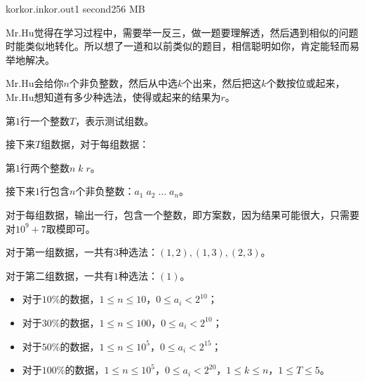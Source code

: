 \documentclass[11pt,a4paper,oneside]{article}
\begin{document}
\begin{problem}{kor}{kor.in}{kor.out}{1 second}{256 MB}	
	
	Mr.Hu觉得在学习过程中，需要举一反三，做一题要理解透，然后遇到相似的问题时能类似地转化。所以想了一道和以前类似的题目，相信聪明如你，肯定能轻而易举地解决。
	
	Mr.Hu会给你$n$个非负整数，然后从中选$k$个出来，然后把这$k$个数按位或起来，Mr.Hu想知道有多少种选法，使得或起来的结果为$r$。
	
	\InputFile
	
	第$1$行一个整数$T$，表示测试组数。
	
	接下来$T$组数据，对于每组数据：
	
	第$1$行两个整数$n \; k \; r$。
	
	接下来$1$行包含$n$个非负整数：$a_1 \; a_2 \; \dots \; a_n$。
	
	\OutputFile
	
	对于每组数据，输出一行，包含一个整数，即方案数，因为结果可能很大，只需要对$10^9 + 7$取模即可。
	
	\Example
	
	\begin{example}
	\end{example}
	
	对于第一组数据，一共有$3$种选法：$(1,2),(1,3),(2,3)$。
	
	对于第二组数据，一共有$1$种选法：$(1)$。
	
	
	\Note
	
	\begin{itemize}
		\item 对于$10\%$的数据，$1 \leq n \leq 10$，$0 \leq a_i < 2^{10}$；
		\item 对于$30\%$的数据，$1 \leq n \leq 100$，$0 \leq a_i < 2^{10}$；
		\item 对于$50\%$的数据，$1 \leq n \leq 10^5$，$0 \leq a_i < 2^{15}$；
		\item 对于$100\%$的数据，$1 \leq n \leq 10^5$，$0 \leq a_i < 2^{20}$，$1 \leq k \leq n$，$1 \leq T \leq 5$。
	\end{itemize}
	
\end{problem}
\end{document}
